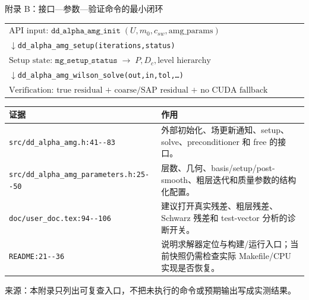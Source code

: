 \documentclass[UTF8,aspectratio=169,11pt]{ctexbeamer}
\newcommand{\source}[1]{%
  \vspace{0.06em}\par{\raggedright\scriptsize\color{muted}来源：#1\par}}
\newcommand{\code}[1]{\nolinkurl{#1}}
\newcommand{\compactframe}{%
  \small
  \setlength{\tabcolsep}{3pt}%
  \renewcommand{\arraystretch}{0.86}%
}
\begin{document}
\begin{frame}[t]{附录 B：接口—参数—验证命令的最小闭环}
  \compactframe
  \begin{tabular}{@{}l@{}}
    $\text{API input: }\texttt{dd\_alpha\_amg\_init}\;(U,m_0,c_{sw},\text{amg\_params})$ \\
    \quad$\downarrow$\quad\texttt{dd\_alpha\_amg\_setup(iterations,status)} \\
    $\text{Setup state: }\texttt{mg\_setup\_status}\;\longrightarrow\;P,D_c,\text{level hierarchy}$ \\
    \quad$\downarrow$\quad\texttt{dd\_alpha\_amg\_wilson\_solve(out,in,tol,\ldots)} \\
    $\text{Verification: true residual + coarse/SAP residual + no CUDA fallback ambiguity}$
  \end{tabular}
  \vspace{0.18cm}
  \begin{tabularx}{0.96\textwidth}{@{}p{}Y@{}}
    \toprule
    证据 & 作用 \\
    \midrule
    \code{src/dd_alpha_amg.h:41--83} & 外部初始化、场更新通知、setup、solve、preconditioner 和 free 的接口。 \\
    \code{src/dd_alpha_amg_parameters.h:25--50} & 层数、几何、basis/setup/post-smooth、粗层迭代和质量参数的结构化配置。 \\
    \code{doc/user_doc.tex:94--106} & 建议打开真实残差、粗层残差、Schwarz 残差和 test-vector 分析的诊断开关。 \\
    \code{README:21--36} & 说明求解器定位与构建/运行入口；当前快照仍需检查实际 Makefile/CPU 实现是否恢复。 \\
    \bottomrule
  \end{tabularx}
  \source{本附录只列出可复查入口，不把未执行的命令或预期输出写成实测结果。}
\end{frame}
\end{document}
